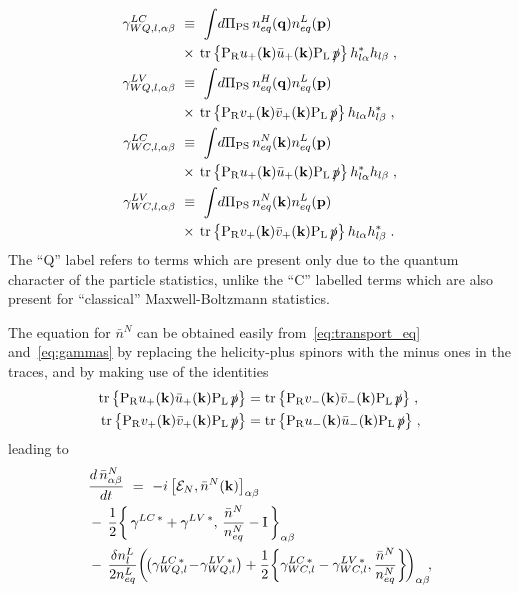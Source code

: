 \documentclass[prd,twocolumn,superscriptaddress,preprintnumbers,nofootinbib,
noshowpacs,groupedaddress]{revtex4-1} %
\DeclareMathOperator{\tr}{tr}
\newcommand{\ve}[1]{\mathbf{#1}}
\begin{document}
\begin{align}
\gamma^{LC}_{WQ,l,\alpha \beta} \ &\equiv \ \int \! d\Pi_{\rm PS} \,  n^H_{eq}(\ve q) n^L_{eq} (\ve p) \notag\\ &\times \,   \tr \big\{\mathrm{P_R} u_+(\ve k) \bar u_+(\ve k) \mathrm{P_L}  \, \slashed{p} \big\} \, 
h^*_{l \alpha} h_{l \beta} \;, \\
\gamma^{LV}_{WQ,l,\alpha \beta} \ &\equiv \ \int \! d\Pi_{\rm PS} \,  n^H_{eq}(\ve q) n^L_{eq} (\ve p)  \notag\\ &\times \,   \tr \big\{\mathrm{P_R} v_+(\ve k) \bar v_+(\ve k) \mathrm{P_L}  \, \slashed{p} \big\} \, 
h_{l \alpha} h^*_{l \beta} \;, \\
\gamma^{LC}_{WC,l,\alpha \beta} \ &\equiv \ \int \! d\Pi_{\rm PS} \,  n^N_{eq}(\ve k) n^L_{eq} (\ve p) \notag\\ &\times \,   \tr \big\{\mathrm{P_R} u_+(\ve k) \bar u_+(\ve k) \mathrm{P_L}  \, \slashed{p} \big\} \, 
h^*_{l \alpha} h_{l \beta} \;, \\
\gamma^{LV}_{WC,l,\alpha \beta} \ &\equiv \ \int \! d\Pi_{\rm PS} \,  n^N_{eq}(\ve k) n^L_{eq} (\ve p)  \notag\\ &\times \,   \tr \big\{\mathrm{P_R} v_+(\ve k) \bar v_+(\ve k) \mathrm{P_L}  \, \slashed{p} \big\} \, 
h_{l \alpha} h^*_{l \beta} \;.
\end{align}
The ``Q'' label refers to terms which are present only due to the quantum character of the particle statistics, unlike the ``C'' labelled terms which are also present for ``classical'' Maxwell-Boltzmann statistics. 

The equation for $\bar n^N$ can be obtained easily from~\eqref{eq:transport_eq} and~\eqref{eq:gammas} by replacing the helicity-plus spinors with the minus ones in the traces, and by making use of the identities
\begin{align}
\tr \big\{\mathrm{P_R} u_+(\ve k) \bar u_+(\ve k) \mathrm{P_L}  \, \slashed{p} \big\}  &=  \tr \big\{\mathrm{P_R} v_-(\ve k) \bar v_-(\ve k) \mathrm{P_L}  \, \slashed{p} \big\} \;, \\
\tr \big\{\mathrm{P_R} v_+(\ve k) \bar v_+(\ve k) \mathrm{P_L}  \, \slashed{p} \big\}  &=  \tr \big\{\mathrm{P_R} u_-(\ve k) \bar u_-(\ve k) \mathrm{P_L}  \, \slashed{p} \big\} \;,
\end{align}
leading to
\begin{align}\label{eq:rate_eq_bar}
& \frac{d \, \bar n^N_{\alpha \beta}}{d t}  \ = \ - i \, \big[\mathcal E_N, \bar n^N(\ve k)\big]_{\alpha \beta} \notag\\
&- \, \frac{1}{2} \bigg\{\, \gamma^{LC \, *} + \gamma^{LV\, *}, \, \frac{\bar n^N}{n^N_{eq}} - \mathrm{I} \, \bigg\}_{\alpha \beta} \notag\\
& - \, \frac{\delta n^L_l}{2 n^L_{eq}} \bigg( \!\big( \gamma^{LC \,*}_{WQ,l} \! - \! \gamma^{LV\,*}_{WQ,l}\big)  + \frac{1}{2} \bigg\{ \gamma^{LC \, *}_{WC,l} - \gamma^{LV \, *}_{WC,l}, \frac{\bar n^N}{n^N_{eq}}\bigg\} \! \bigg)_{\alpha \beta} \!,
\end{align}
\end{document}
